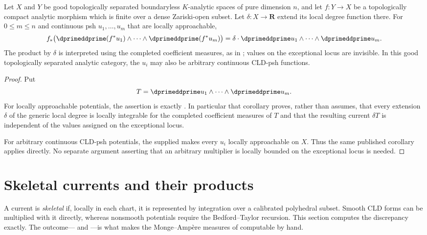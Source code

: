 \begin{proposition}
\label{prop:ch16-generically-finite-pushforward}
Let $X$ and $Y$ be good topologically separated boundaryless
$K$-analytic spaces of pure dimension $n$, and let $f:Y\to X$ be a
topologically compact analytic morphism which is finite over a dense
Zariski-open subset.  Let $\delta:X\to\mathbf R$ extend its local degree
function there.  For $0\leq m\leq n$ and continuous psh
$u_1,\ldots,u_m$ that are locally approachable,
\[
 f_*\bigl(\dprimeddprime(f^*u_1)\wedge\cdots\wedge
    \dprimeddprime(f^*u_m)\bigr)
 =\delta\cdot\dprimeddprime u_1\wedge\cdots\wedge\dprimeddprime u_m .
\]
The product by $\delta$ is interpreted using the completed coefficient
measures, as in \cite[Corollary~16.9.5]{CLD25}; values on the exceptional
locus are invisible.  In this good topologically separated analytic
category, the $u_i$ may also be arbitrary continuous CLD-psh functions.
\end{proposition}

\begin{proof}
Put
\[
 T=\dprimeddprime u_1\wedge\cdots\wedge\dprimeddprime u_m.
\]
For locally approachable potentials, the assertion is exactly
\cite[Corollary~16.9.5]{CLD25}.  In particular that corollary proves, rather
than assumes, that every extension $\delta$ of the generic local degree is
locally integrable for the completed coefficient measures of $T$ and that
the resulting current $\delta T$ is independent of the values assigned on
the exceptional locus.

For arbitrary continuous CLD-psh potentials, the supplied
 makes every $u_i$
locally approachable on $X$.  Thus the same published corollary applies
directly.  No separate argument asserting that an arbitrary multiplier is
locally bounded on the exceptional locus is needed.
\end{proof}

\section{Skeletal currents and their products}
\label{sec:ch16-skeletal}

A current is \emph{skeletal} if, locally in each chart, it is represented by
integration over a calibrated polyhedral subset.  Smooth CLD forms can be
multiplied with it directly, whereas nonsmooth potentials require the
Bedford--Taylor recursion.  This section computes the discrepancy exactly.
The outcome--- and
---is what makes the Monge--Amp\`ere measures
of  computable by hand.

